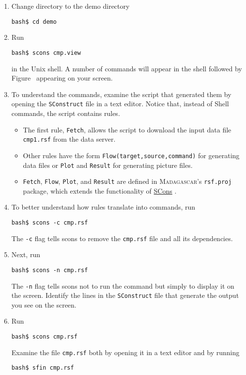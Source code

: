 \begin{enumerate}
\item Change directory to the demo directory
\begin{verbatim}
bash$ cd demo
\end{verbatim}
\item Run
\begin{verbatim}
bash$ scons cmp.view
\end{verbatim}
in the Unix shell. A number of commands will appear in the shell followed by Figure~ appearing on your screen. 
\item To understand the commands, examine the script that generated them by opening the \texttt{SConstruct} file in a text editor. Notice that, instead of Shell commands, the script contains rules. 
\begin{itemize}
\item The first rule, \texttt{Fetch}, allows the script to download the input data file \texttt{cmp1.rsf} from the data server. 
\item Other rules have the form \texttt{Flow(target,source,command)} for generating data files or \texttt{Plot} and  \texttt{Result} for 
generating picture files. 
\item \texttt{Fetch}, \texttt{Flow}, \texttt{Plot}, and \texttt{Result} are defined in \textsc{Madagascar}'s \texttt{rsf.proj} package, which extends the functionality of \href{http://www.scons.org}{SCons}
.
\end{itemize}
\item To better understand how rules translate into commands, run 
\begin{verbatim}
bash$ scons -c cmp.rsf
\end{verbatim}
The \texttt{-c} flag tells scons to remove the \texttt{cmp.rsf} file and all its dependencies.
\item Next, run
\begin{verbatim}
bash$ scons -n cmp.rsf
\end{verbatim}
The \texttt{-n} flag tells scons not to run the command but simply to display it on the screen. Identify the lines in the \texttt{SConstruct} file that generate the output you see on the screen.
\item Run
\begin{verbatim}
bash$ scons cmp.rsf
\end{verbatim}
Examine the file \texttt{cmp.rsf} both by opening it in a text editor and by running
\begin{verbatim}
bash$ sfin cmp.rsf
\end{verbatim}


\end{enumerate}
